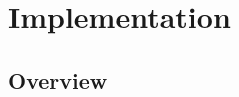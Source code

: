 \documentclass[master.tex]{subfiles}
\begin{document}
\part{Implementation}

\chapter{Overview}
\end{document}
